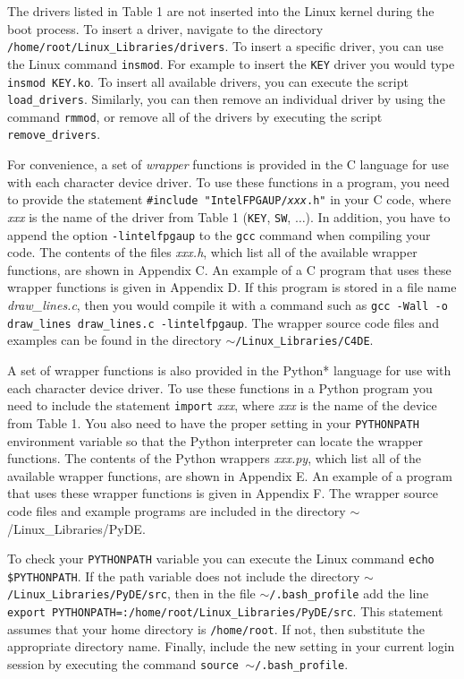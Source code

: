 \documentclass[11pt, twoside, pdftex]{article}
\begin{document}
The drivers listed in Table 1 are not inserted into the Linux kernel during the boot
process. To insert a driver, navigate to the directory
\texttt{/home/root/Linux\_Libraries/drivers}. To insert a specific driver, you can use the
Linux command \texttt{insmod}. For example to insert the \texttt{KEY} driver you would
type \texttt{insmod KEY.ko}. To insert all available drivers, you can execute the script
\texttt{load\_drivers}. Similarly, you can then remove an individual driver by using the
command \texttt{rmmod}, or remove all of the drivers by executing the script
\texttt{remove\_drivers}.

For convenience, a set of {\it wrapper} functions is provided in the C language for use with 
each character device driver. To use these functions in a program, you need 
to provide the statement \texttt{\#include "IntelFPGAUP/{\it xxx}.h"} in your C code, 
where {\it xxx} is the name of the driver from Table 1 (\texttt{KEY}, \texttt{SW}, $\ldots$). 
In addition, you have to append the option \texttt{-lintelfpgaup} to the \texttt{gcc} command when 
compiling your code. The contents of the files {\it xxx.h}, which list all of the 
available wrapper functions, are shown in Appendix C. An example of a C program that uses 
these wrapper functions is given in Appendix D. If this program is stored in a file 
name {\it draw\_lines.c}, then you would compile it with a command such as 
\texttt{gcc -Wall -o draw\_lines draw\_lines.c -lintelfpgaup}. The wrapper source code
files and examples can be found in the directory \texttt{$\sim$/Linux\_Libraries/C4DE}.

A set of wrapper functions is also provided in the Python* language for use with each character 
device driver. To use these functions in a Python program you need to include the 
statement \texttt{import} {\it xxx}, where {\it xxx} is the name of the device from Table 1. 
You also need to have the proper setting in your \texttt{PYTHONPATH} environment variable so that
the Python interpreter can locate the wrapper functions. The contents of the Python 
wrappers {\it xxx.py}, which list all of the available wrapper functions, are shown in 
Appendix E. An example of a program that uses these wrapper functions is given in Appendix F.
The wrapper source code files and example programs are included in the directory
$\sim$/Linux\_Libraries/PyDE.

To check your \texttt{PYTHONPATH} variable you can execute the 
Linux command \texttt{echo \$PYTHONPATH}.
If the path variable does not include the directory \texttt{$\sim$/Linux\_Libraries/PyDE/src},
then in the file \texttt{$\sim$/.bash\_profile} add the line 
\texttt{export PYTHONPATH=:/home/root/Linux\_Libraries/PyDE/src}. This statement assumes 
that your home directory is \texttt{/home/root}. If not, then substitute the appropriate 
directory name. Finally, include the new setting in your current login session by executing 
the command \texttt{source $\sim$/.bash\_profile}. 
\end{document}
